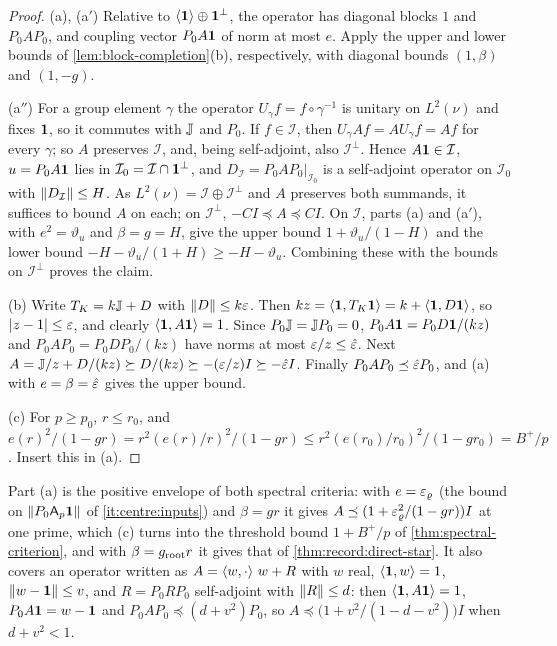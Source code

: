 \begin{proof}
(a), (a$'$) Relative to $\langle\mathbf 1\rangle\oplus\mathbf 1^\perp$, the operator
has diagonal blocks $1$ and $P_0AP_0$, and coupling vector $P_0A\mathbf 1$ of
norm at most $e$. Apply the upper and lower bounds of
\cref{lem:block-completion}(b), respectively, with diagonal bounds
$(1,\beta)$ and $(1,-g)$.

(a$''$) For a group element $\gamma$ the operator $U_\gamma f=f\circ\gamma^{-1}$
is unitary on $L^2(\nu)$ and fixes $\mathbf 1$, so it commutes with $\mathbb J$ and
$P_0$. If $f\in\mathcal I$, then $U_\gamma Af=AU_\gamma f=Af$ for every
$\gamma$; so $A$ preserves $\mathcal I$, and, being self-adjoint, also
$\mathcal I^\perp$. Hence $A\mathbf 1\in\mathcal I$, $u=P_0A\mathbf 1$ lies in
$\mathcal I_0=\mathcal I\cap\mathbf 1^\perp$, and $D_{\mathcal I}=P_0AP_0|_{\mathcal I_0}$
is a self-adjoint operator on $\mathcal I_0$ with $\left\|D_{\mathcal I}\right\|\le H$. As
$L^2(\nu)=\mathcal I\oplus\mathcal I^\perp$ and $A$ preserves both summands, it
suffices to bound $A$ on each; on $\mathcal I^\perp$, $-CI\preceq A\preceq CI$.
On $\mathcal I$, parts (a) and (a$'$), with $e^2=\vartheta_u$ and
$\beta=g=H$, give the upper bound $1+\vartheta_u/(1-H)$ and the lower bound
$-H-\vartheta_u/(1+H)\ge-H-\vartheta_u$. Combining these with the bounds on
$\mathcal I^\perp$ proves the claim.

(b) Write $T_K=k\mathbb J+D$ with $\left\|D\right\|\le k\varepsilon$. Then
$kz=\left\langle \mathbf 1,T_K\mathbf 1\right\rangle=k+\left\langle \mathbf 1,D\mathbf 1\right\rangle$, so $|z-1|\le\varepsilon$, and clearly
$\left\langle \mathbf 1,A\mathbf 1\right\rangle=1$. Since $P_0\mathbb J=\mathbb J P_0=0$, $P_0A\mathbf 1=P_0D\mathbf 1/(kz)$ and
$P_0AP_0=P_0DP_0/(kz)$ have norms at most $\varepsilon/z\le\hat{\varepsilon}$. Next
$A=\mathbb J/z+D/(kz)\succeq D/(kz)\succeq-(\varepsilon/z)I\succeq-\hat{\varepsilon} I$. Finally
$P_0AP_0\preceq\hat{\varepsilon} P_0$, and (a) with $e=\beta=\hat{\varepsilon}$ gives the upper
bound.

(c) For $p\ge p_0$, $r\le r_0$, and
$e(r)^2/(1-gr)=r^2(e(r)/r)^2/(1-gr)\le r^2(e(r_0)/r_0)^2/(1-gr_0)=B^+/p$.
Insert this in (a).
\end{proof}

Part (a) is the positive envelope of both spectral criteria: with
$e=\varepsilon_\varrho$ (the bound on $\left\|P_0\mathsf A_p\mathbf 1\right\|$ of
\ref{it:centre:inputs}) and $\beta=gr$ it gives
$A\preceq(1+\varepsilon_\varrho^2/(1-gr))I$ at one
prime, which (c) turns into the threshold bound $1+B^+/p$ of
\cref{thm:spectral-criterion}, and with $\beta=g_{\rm root}r$ it gives that of
\cref{thm:record:direct-star}. It also covers an
operator written as $A=\left\langle w,\cdot\right\rangle\,w+R$ with $w$ real, $\left\langle \mathbf 1,w\right\rangle=1$,
$\left\|w-\mathbf 1\right\|\le v$, and $R=P_0RP_0$ self-adjoint with $\left\|R\right\|\le d$: then
$\left\langle \mathbf 1,A\mathbf 1\right\rangle=1$,
$P_0A\mathbf 1=w-\mathbf 1$ and $P_0AP_0\preceq(d+v^2)P_0$, so
$A\preceq\big(1+v^2/(1-d-v^2)\big)I$ when $d+v^2<1$.

